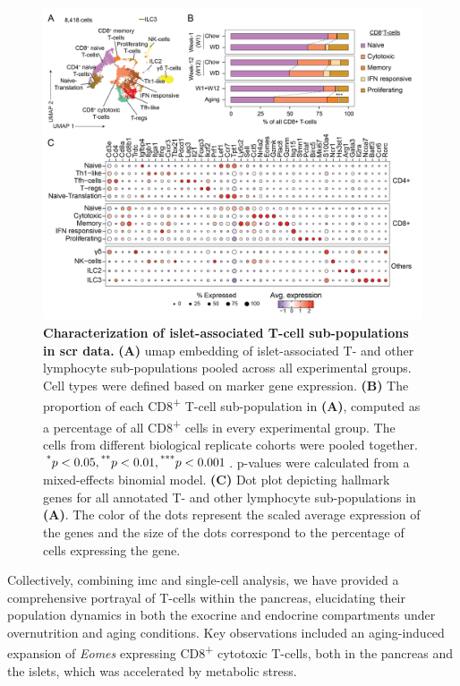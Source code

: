 \begin{figure}[t!]
\centering
\includegraphics[width=\linewidth]{Chapter4/Fig/F2-10-01.png}
\caption[Characterization of T-cell sub-populations in  data]{\textbf{Characterization of islet-associated T-cell sub-populations in \gls{scr} data.} \textbf{(A)} \gls{umap} embedding of islet-associated T- and other lymphocyte sub-populations pooled across all experimental groups. Cell types were defined based on marker gene expression. \textbf{(B)} The proportion of each CD8\textsuperscript{+} T-cell sub-population in \textbf{(A)}, computed as a percentage of all CD8\textsuperscript{+} cells in every experimental group. The cells from different biological replicate cohorts were pooled together.  $\textsuperscript{*} p < 0.05, \textsuperscript{**} p < 0.01, \textsuperscript{***} p < 0.001$. p-values were calculated from a mixed-effects binomial model. \textbf{(C)} Dot plot depicting hallmark genes for all annotated T- and other lymphocyte sub-populations in \textbf{(A)}. The color of the dots represent the scaled average expression of the genes and the size of the dots correspond to the percentage of cells expressing the gene.
}
\label{fig:chp2_scrna_tcells1}
\end{figure}

\par Collectively, combining \gls{imc} and single-cell analysis, we have provided a comprehensive portrayal of T-cells within the pancreas, elucidating their population dynamics in both the exocrine and endocrine compartments under overnutrition and aging conditions. Key observations included an aging-induced expansion of \textit{Eomes} expressing CD8\textsuperscript{+} cytotoxic T-cells, both in the pancreas and the islets, which was accelerated by metabolic stress.

